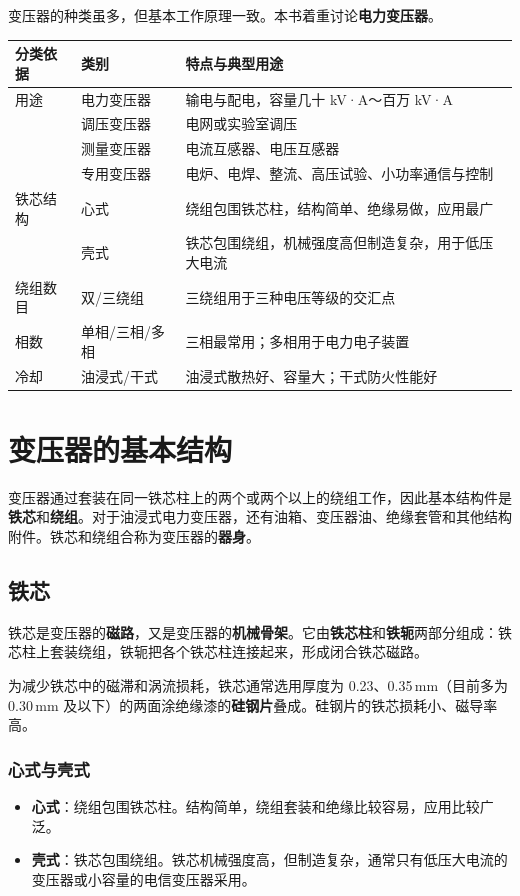 变压器的种类虽多，但基本工作原理一致。本书着重讨论\textbf{电力变压器}。

\begin{center}
\begin{tabular}{@{}llp{7.6cm}@{}}
\toprule
分类依据 & 类别 & 特点与典型用途 \\
\midrule
用途 & 电力变压器 & 输电与配电，容量几十 kV·A～百万 kV·A \\
 & 调压变压器 & 电网或实验室调压 \\
 & 测量变压器 & 电流互感器、电压互感器 \\
 & 专用变压器 & 电炉、电焊、整流、高压试验、小功率通信与控制 \\
铁芯结构 & 心式 & 绕组包围铁芯柱，结构简单、绝缘易做，应用最广 \\
 & 壳式 & 铁芯包围绕组，机械强度高但制造复杂，用于低压大电流 \\
绕组数目 & 双/三绕组 & 三绕组用于三种电压等级的交汇点 \\
相数 & 单相/三相/多相 & 三相最常用；多相用于电力电子装置 \\
冷却 & 油浸式/干式 & 油浸式散热好、容量大；干式防火性能好 \\
\bottomrule
\end{tabular}
\end{center}

\section{变压器的基本结构}

变压器通过套装在同一铁芯柱上的两个或两个以上的绕组工作，因此基本结构件是\textbf{铁芯}和\textbf{绕组}。对于油浸式电力变压器，还有油箱、变压器油、绝缘套管和其他结构附件。铁芯和绕组合称为变压器的\textbf{器身}。

\subsection{铁芯}
铁芯是变压器的\textbf{磁路}，又是变压器的\textbf{机械骨架}。它由\textbf{铁芯柱}和\textbf{铁轭}两部分组成：铁芯柱上套装绕组，铁轭把各个铁芯柱连接起来，形成闭合铁芯磁路。

为减少铁芯中的磁滞和涡流损耗，铁芯通常选用厚度为 0.23、0.35\,mm（目前多为 0.30\,mm 及以下）的两面涂绝缘漆的\textbf{硅钢片}叠成。硅钢片的铁芯损耗小、磁导率高。

\subsubsection{心式与壳式}
\begin{itemize}
  \item \textbf{心式}：绕组包围铁芯柱。结构简单，绕组套装和绝缘比较容易，应用比较广泛。
  \item \textbf{壳式}：铁芯包围绕组。铁芯机械强度高，但制造复杂，通常只有低压大电流的变压器或小容量的电信变压器采用。
\end{itemize}

